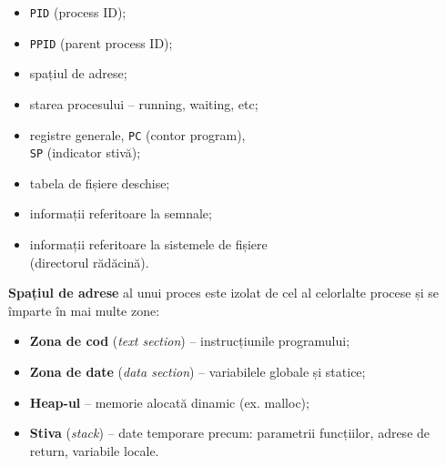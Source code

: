\documentclass[12pt,a4paper]{article}
\begin{document}
\begin{center}
  \begin{minipage}{0.70\textwidth}
    \begin{itemize}
      \setlength{\itemsep}{0.75pt}
      \item \texttt{PID} (process ID);
      \item \texttt{PPID} (parent process ID); 
      \item spațiul de adrese;
      \item starea procesului -- running, waiting, etc;
      \item registre generale, \texttt{PC} (contor program), \\
      \texttt{SP} (indicator stivă);
      \item tabela de fișiere deschise;
      \item informații referitoare la semnale;
      \item informații referitoare la sistemele de fișiere \\
      (directorul rădăcină).
    \end{itemize}
  \end{minipage}
  \hfill
  \begin{minipage}{0.26\textwidth}
  \end{minipage}
\end{center}

\medskip
\textbf{Spațiul de adrese} al unui proces este izolat de cel al celorlalte procese 
și se împarte în mai multe zone:
\begin{itemize}
  \setlength{\itemsep}{0.75pt}
  \item \textbf{Zona de cod} (\textit{text section}) -- instrucțiunile programului;
  \item \textbf{Zona de date} (\textit{data section}) -- variabilele globale și statice;
  \item \textbf{Heap-ul} -- memorie alocată dinamic (ex. malloc);
  \item \textbf{Stiva} (\textit{stack}) -- date temporare precum: parametrii funcțiilor,
  adrese de return, variabile locale.
\end{itemize}
\medskip
\end{document}
